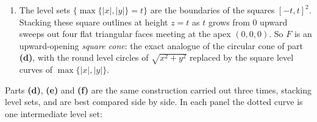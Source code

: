 \begin{exercisesolution}
\begin{enumerate}[label=\textbf{(\alph*)}]
  \item The level sets $\{\max\{|x|,|y|\}=t\}$ are the boundaries of the squares $[-t,t]^2$.
    Stacking these square outlines at height $z=t$ as $t$ grows from $0$ upward sweeps out four
    flat triangular faces meeting at the apex $(0,0,0)$. So $F$ is an upward-opening
    \emph{square cone}: the exact analogue of the circular cone of part \textbf{(d)}, with the
    round level circles of $\sqrt{x^2+y^2}$ replaced by the square level curves of
    $\max\{|x|,|y|\}$.
\end{enumerate}

Parts \textbf{(d)}, \textbf{(e)} and \textbf{(f)} are the same construction carried out three
times, stacking level sets, and are best compared side by side. In each panel the dotted curve is
one intermediate level set:

\begin{center}
\end{center}
\end{exercisesolution}
